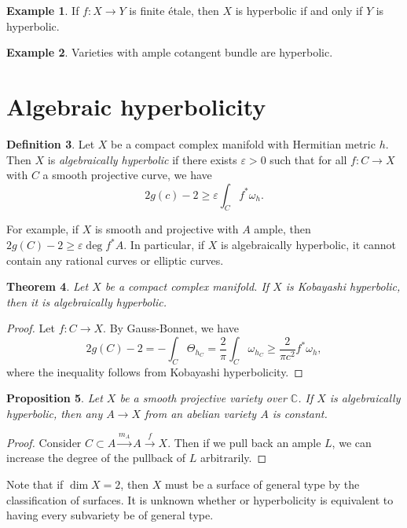 \documentclass[leqno, openany]{memoir}
\newtheorem{thm}{Theorem}[section]
\newtheorem{prop}[thm]{Proposition}
\theoremstyle{definition}
\newtheorem{defn}[thm]{Definition}
\newtheorem{exm}[thm]{Example}
\theoremstyle{remark}
\theoremstyle{plain}
\theoremstyle{definition}
\theoremstyle{remark}
\newcommand{\C}{\mathbb{C}}
\newcommand{\ep}{\varepsilon}
\begin{document}
\begin{exm}
    If $f \colon X \to Y$ is finite \'etale, then $X$ is hyperbolic if and only if $Y$ is hyperbolic.
\end{exm}

\begin{exm}
    Varieties with ample cotangent bundle are hyperbolic.
\end{exm}

\section{Algebraic hyperbolicity}
\begin{defn}
    Let $X$ be a compact complex manifold with Hermitian metric $h$. Then $X$ is \textit{algebraically hyperbolic} if there exists $\ep > 0$ such that for all $f \colon C \to X$ with $C$ a smooth projective curve, we have
    \[ 2 g(c) - 2 \geq \ep \int_C f^* \omega_h. \]
\end{defn}

For example, if $X$ is smooth and projective with $A$ ample, then $2g(C) - 2 \geq \ep \deg f^* A$. In particular, if $X$ is algebraically hyperbolic, it cannot contain any rational curves or elliptic curves.

\begin{thm}
    Let $X$ be a compact complex manifold. If $X$ is Kobayashi hyperbolic, then it is algebraically hyperbolic.
\end{thm}

\begin{proof}
    Let $f \colon C \to X$. By Gauss-Bonnet, we have
    \[ 2 g(C) - 2 = - \int_C \Theta_{h_C} = \frac{2}{\pi} \int_C \omega_{h_C} \geq \frac{2}{\pi c^2} f^* \omega_h, \]
    where the inequality follows from Kobayashi hyperbolicity.
\end{proof}

\begin{prop}
    Let $X$ be a smooth projective variety over $\C$. If $X$ is algebraically hyperbolic, then any $A \to X$ from an abelian variety $A$ is constant.
\end{prop}

\begin{proof}
    Consider $C \subset A \xrightarrow{m_A} A \xrightarrow{f} X$. Then if we pull back an ample $L$, we can increase the degree of the pullback of $L$ arbitrarily.
\end{proof}

Note that if $\dim X = 2$, then $X$ must be a surface of general type by the classification of surfaces. It is unknown whether or hyperbolicity is equivalent to having every subvariety be of general type.
\end{document}
